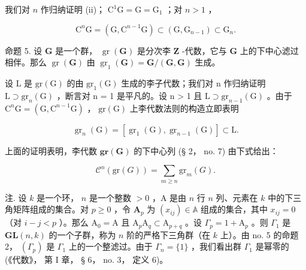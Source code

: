 我们对 \(n\) 作归纳证明 (ii)； \(\mathrm{C}^1\mathrm{G} = \mathrm{G} = \mathrm{G}_1\) ；对 \(n > 1\) ，

\[
\mathrm{C} ^ {n} \mathrm{G} = (\mathrm{G}, \mathrm{C} ^ {n - 1} \mathrm{G}) \subset (\mathrm{G}, \mathrm{G} _ {n - 1}) \subset \mathrm{G} _ {n}.
\]

命题 5. 设 \(\mathbf{G}\) 是一个群， \(\operatorname{gr}(\mathbf{G})\) 是分次李 \(\mathbf{Z}\) -代数，它与 \(\mathbf{G}\) 上的下中心滤过相伴。那么 \(\operatorname{gr}(\mathbf{G})\) 由 \(\operatorname{gr}_1(\mathbf{G}) = \mathbf{G}/(\mathbf{G},\mathbf{G})\) 生成。

设 L 是 \(\mathrm{gr}(\mathrm{G})\) 的由 \(\mathrm{gr}_{1}(\mathrm{G})\) 生成的李子代数；我们对 n 作归纳证明 \(\mathrm{L} \supset \mathrm{gr}_{n}(\mathrm{G})\) ，断言对 n = 1 是平凡的。设 n > 1 且 \(\mathrm{L} \supset \mathrm{gr}_{n-1}(\mathrm{G})\) 。由于 \(\mathrm{C}^{n}\mathrm{G} = (\mathrm{G}, \mathrm{C}^{n-1}\mathrm{G})\) ， \(\mathrm{gr}(\mathrm{G})\) 上李代数法则的构造立即表明

\[
\operatorname{gr} _ {n} (\mathrm{G}) = \left[ \operatorname{gr} _ {1} (\mathrm{G}), \operatorname{gr} _ {n - 1} (\mathrm{G}) \right] \subset \mathrm{L}.
\]

上面的证明表明，李代数 \(\mathbf{gr}(\mathbf{G})\) 的下中心列 (§ 2， no. 7) 由下式给出：

\[
\mathcal {C} ^ {n} (\mathrm{gr} (G)) = \sum_ {m \geqslant n} \mathrm{gr} _ {m} (G).\tag{29}
\]

注. 设 \(k\) 是一个环， \(n\) 是一个整数 \(>0\) ，A 是由 \(n\) 行 \(n\) 列、元素在 \(k\) 中的下三角矩阵组成的集合。对 \(p \geqslant 0\) ，令 \(\mathbf{A}_p\) 为 \((x_{ij}) \in \mathbb{A}\) 组成的集合，其中 \(x_{ij} = 0\) （对 \(i - j < p\) ）。那么 \(\mathrm{A}_0 = \mathrm{A}\) 且 \(\mathrm{A}_p\mathrm{A}_q \subset \mathrm{A}_{p + q}\) 。设 \(\Gamma_p = 1 + \mathrm{A}_p\) 。则 \(\Gamma_1\) 是 \(\mathbf{GL}(n,k)\) 的一个子群，称为 \(n\) 阶的严格下三角群（在 \(k\) 上）。由 no. 5 的命题 2， \((\Gamma_p)\) 是 \(\Gamma_1\) 上的一个整滤过。由于 \(\Gamma_n = \{1\}\) ，我们看出群 \(\Gamma_1\) 是幂零的 (《代数》， 第 I 章， § 6， no. 3， 定义 6)。

